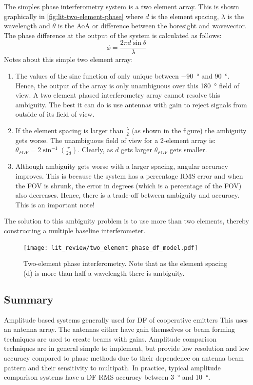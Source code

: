 The simples phase interferometry system is a two element array. This is shown graphically in \autoref{fig:lit-two-element-phase} where \(d\) is the element spacing, \(\lambda\) is the wavelength and \(\theta\) is the AoA or difference between the boresight and wavevector.
The phase difference at the output of the system is calculated as follows:
\begin{equation}
\phi = \frac{2 \pi d \sin \theta}{\lambda}
\end{equation}
Notes about this simple two element array:
\begin{enumerate}
  \item The values of the sine function of only unique between \SI{-90}{\degree} and \SI{90}{\degree}. Hence, the output of the array is only unambiguous over this \SI{180}{\degree} field of view. A two element phased interferometry array cannot resolve this ambiguity. The best it can do is use antennas with gain to reject signals from outside of its field of view.
  \item If the element spacing is larger than \(\frac{\lambda}{2}\) (as shown in the figure) the ambiguity gets worse. The unambiguous field of view for a 2-element array is: \(\theta_{FOV} = 2 \sin^{-1}(\frac{\pi}{2d})\). Clearly, as \(d\) gets larger \(\theta_{FOV}\) gets smaller. 
  \item Although ambiguity gets worse with a larger spacing, angular accuracy improves. This is because the system has a percentage RMS error and when the FOV is shrunk, the error in degrees (which is a percentage of the FOV) also decreases. Hence, there is a trade-off between ambiguity and accuracy. This is an important note!
 \end{enumerate}
 The solution to this ambiguity problem is to use more than two elements, thereby constructing a multiple baseline interferometer. 

\begin{figure}
   \centering
   \texttt{[image: lit\_review/two\_element\_phase\_df\_model.pdf]}
   \caption{Two-element phase interferometry. Note that as the element spacing (d) is more than half a wavelength there is ambiguity.}
   \label{fig:lit-two-element-phase}
\end{figure}

\subsection{Summary}
Amplitude based systems generally used for DF of cooperative emitters \cite{jenkins1991smallaperture}
This uses an antenna array. The antennas either have gain themselves or beam forming techniques are used to create beams with gains. Amplitude comparison techniques are in general simple to implement, but provide low resolution and low accuracy compared to phase methods due to their dependence on antenna beam pattern and their sensitivity to multipath. In practice, typical amplitude comparison systems have a DF RMS accuracy between \SI{3}{\degree} and \SI{10}{\degree}.

